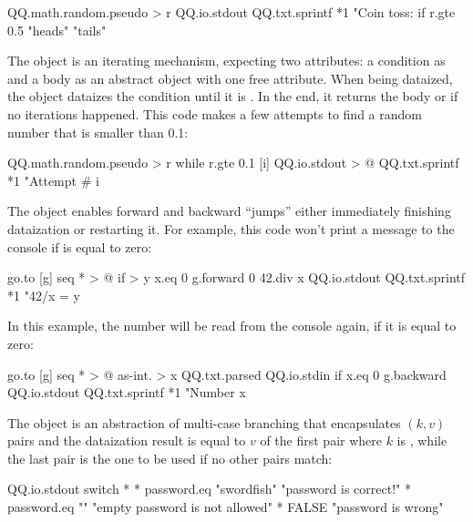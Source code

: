 \documentclass[sigplan,nonacm]{acmart}
\newcommand\aff[1]{\ff{\textcolor{gray}{\(\star\)}#1}}
\newcommand\deff[1]{\ff{\textcolor{blue!50!black}{\textbf{#1}}}}
\newcommand\adeff[1]{\aff{\textcolor{blue!50!black}{\textbf{#1}}}}
\begin{document}
\begin{ffcode}
QQ.math.random.pseudo > r
QQ.io.stdout
  QQ.txt.sprintf *1
    "Coin toss: %
    if
      r.gte 0.5
      "heads"
      "tails"
\end{ffcode}

The \adeff{while} object is an iterating mechanism, expecting two attributes: a condition as  and a body as an abstract object with one free attribute.
When being dataized, the object \aff{while} dataizes the condition until it is .
In the end, it returns the body or  if no iterations happened.
This code makes a few attempts to find a random number that is smaller than 0.1:

\begin{ffcode}
QQ.math.random.pseudo > r
while
  r.gte 0.1
  [i]
    QQ.io.stdout > @
      QQ.txt.sprintf *1
        "Attempt #%
        i
\end{ffcode}

The \adeff{go} object enables forward and backward ``jumps'' either immediately finishing dataization or restarting it.
For example, this code won't print a message to the console if  is equal to zero:

\begin{ffcode}
go.to
  [g]
    seq * > @
      if > y
        x.eq 0
        g.forward 0
        42.div x
      QQ.io.stdout
        QQ.txt.sprintf *1
          "42/x = %
          y
\end{ffcode}

In this example, the number will be read from the console again, if it is equal to zero:

\begin{ffcode}
go.to
  [g]
    seq * > @
      as-int. > x
        QQ.txt.parsed
          QQ.io.stdin
      if
        x.eq 0
        g.backward
        QQ.io.stdout
          QQ.txt.sprintf *1
            "Number %
            x
\end{ffcode}

The \deff{switch} object is an abstraction of multi-case branching that encapsulates \((k, v)\) pairs and the dataization result is equal to \(v\) of the first pair where \(k\) is , while the last pair is the one to be used if no other pairs match:

\begin{ffcode}
QQ.io.stdout
  switch *
    *
      password.eq "swordfish"
      "password is correct!"
    *
      password.eq ""
      "empty password is not allowed"
    *
      FALSE
      "password is wrong"
\end{ffcode}
\end{document}

